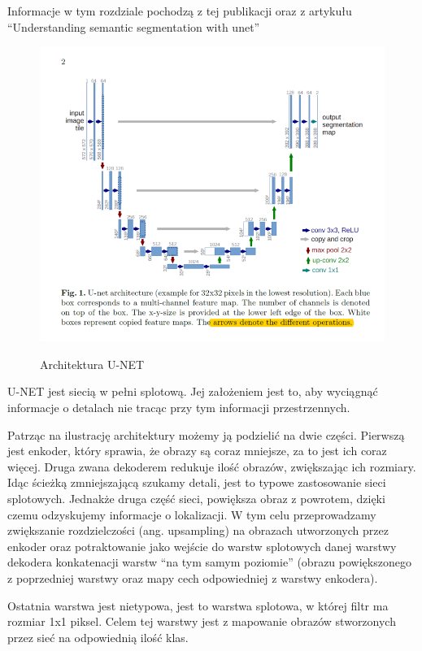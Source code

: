 \documentclass{article}
\begin{document}
Informacje w tym rozdziale pochodzą z tej publikacji oraz z artykułu ``Understanding semantic segmentation with unet''\cite{unet}
\begin{figure}[H]
    \centering
    \includegraphics[width=\linewidth]{images/unet.png}
    \caption{Architektura U-NET}
    \cite{unetpaper}
    \label{Wizualizacja architektury U-NET}
\end{figure}
U-NET jest siecią w pełni splotową.
Jej założeniem jest to, aby wyciągnąć informacje o detalach nie tracąc przy tym informacji przestrzennych.

Patrząc na ilustrację architektury możemy ją podzielić na dwie części.
Pierwszą jest enkoder, który sprawia, że obrazy są coraz mniejsze, za to jest ich coraz więcej.
Druga zwana dekoderem redukuje ilość obrazów, zwiększając ich rozmiary.
Idąc ścieżką zmniejszającą szukamy detali, jest to typowe zastosowanie sieci splotowych. Jednakże druga część sieci, powiększa obraz z powrotem, dzięki czemu odzyskujemy informacje o lokalizacji.
W tym celu przeprowadzamy zwiększanie rozdzielczości (ang. upsampling) na obrazach utworzonych przez enkoder oraz potraktowanie jako wejście do warstw splotowych danej warstwy dekodera konkatenacji warstw ``na tym samym poziomie'' (obrazu powiększonego z poprzedniej warstwy oraz mapy cech odpowiedniej z warstwy enkodera).

Ostatnia warstwa jest nietypowa, jest to warstwa splotowa, w której filtr ma rozmiar 1x1 piksel. Celem tej warstwy jest z mapowanie obrazów stworzonych przez sieć na odpowiednią ilość klas.
\end{document}
